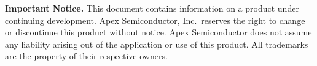 \documentclass[10pt,a4paper]{article}
\begin{document}
\vspace{10pt}
\begin{tcolorbox}[colback=lightbg, colframe=lightbg!60!black, boxrule=0.4pt, arc=1pt,
  left=8pt, right=8pt, top=6pt, bottom=6pt]
{\footnotesize\color{neutral}\textbf{Important Notice.} This document contains
information on a product under continuing development. Apex Semiconductor,
Inc.\ reserves the right to change or discontinue this product without
notice. Apex Semiconductor does not assume any liability arising out of the
application or use of this product. All trademarks are the property of their
respective owners.}
\end{tcolorbox}
\end{document}
